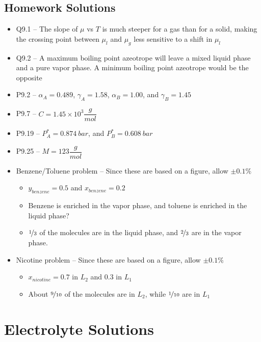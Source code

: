 \documentclass[12pt, openany, letterpaper]{memoir}
\begin{document}
\section*{Homework Solutions}
\begin{itemize}
	\item Q9.1 -- The slope of $\mu$ vs $T$ is much steeper for a gas than for a solid, making the crossing point between $\mu_l$ and $\mu_g$ less sensitive to a shift in $\mu_l$
	\item Q9.2 -- A maximum boiling point azeotrope will leave a mixed liquid phase and a pure vapor phase. A minimum boiling point azeotrope would be the opposite
	\item P9.2 -- $\alpha_A = 0.489$, $\gamma_A = 1.58$, $\alpha_B = 1.00$, and $\gamma_B = 1.45$
	\item P9.7 -- $C = 1.45\times10^3\dfrac{g}{mol}$
	\item P9.19 -- $P^*_A = 0.874~bar$, and $P^*_B = 0.608~bar$
	\item P9.25 -- $M = 123\dfrac{g}{mol}$
	\item Benzene/Toluene problem -- Since these are based on a figure, allow $\pm 0.1\%$ 
	\begin{itemize}
		\item $y_{benzene} = 0.5$ and $x_{benzene} = 0.2$
		\item Benzene is enriched in the vapor phase, and toluene is enriched in the liquid phase?
		\item $\nicefrac{1}{3}$ of the molecules are in the liquid phase, and $\nicefrac{2}{3}$ are in the vapor phase.
	\end{itemize}
	\item Nicotine problem -- Since these are based on a figure, allow $\pm 0.1\%$ 
	\begin{itemize}
		\item $x_{nicotine} = 0.7$ in $L_2$ and $0.3$ in $L_1$
		\item About $\nicefrac{9}{10}$ of the molecules are in $L_2$, while $\nicefrac{1}{10}$ are in $L_1$
	\end{itemize}
\end{itemize}
\chapter{Electrolyte Solutions}
\end{document}
